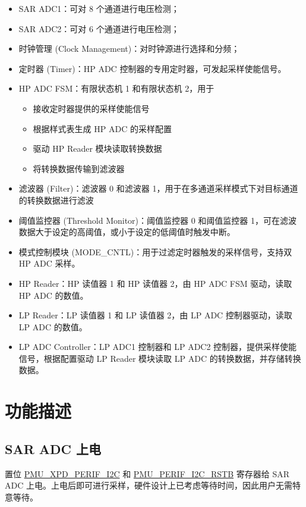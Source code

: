 \documentclass[main\_\_CN.tex]{subfiles}
\begin{document}
\begin{itemize}
    \item SAR ADC1：可对 8 个通道进行电压检测；
    \item SAR ADC2：可对 6 个通道进行电压检测；
    \item 时钟管理 (Clock Management)：对时钟源进行选择和分频；
    \item 定时器 (Timer)：HP ADC 控制器的专用定时器，可发起采样使能信号。
    \item HP ADC FSM：有限状态机 1 和有限状态机 2，用于
    \begin{itemize}
        \item 接收定时器提供的采样使能信号
        \item 根据样式表生成 HP ADC 的采样配置
        \item 驱动 HP Reader 模块读取转换数据
        \item 将转换数据传输到滤波器
    \end{itemize}
    \item 滤波器 (Filter)：滤波器 0 和滤波器 1，用于在多通道采样模式下对目标通道的转换数据进行滤波
    \item 阈值监控器 (Threshold Monitor)：阈值监控器 0 和阈值监控器 1，可在滤波数据大于设定的高阈值，或小于设定的低阈值时触发中断。
    \item 模式控制模块 (MODE\_CNTL)：用于过滤定时器触发的采样信号，支持双 HP ADC 采样。
    \item HP Reader：HP 读值器 1 和 HP 读值器 2，由 HP ADC FSM 驱动，读取 HP ADC 的数值。
    \item LP Reader：LP 读值器 1 和 LP 读值器 2，由 LP ADC 控制器驱动，读取 LP ADC  的数值。
    \item LP ADC Controller：LP ADC1 控制器和 LP ADC2 控制器，提供采样使能信号，根据配置驱动 LP Reader 模块读取 LP ADC 的转换数据，并存储转换数据。
\end{itemize}

\section{功能描述}
\subsection{SAR ADC 上电}
置位 \hyperref[fielddesc:PMUXPDPERIFI2C]{PMU\_XPD\_PERIF\_I2C} 和 \hyperref[fielddesc:PMUPERIFI2CRSTB]{PMU\_PERIF\_I2C\_RSTB} 寄存器给 SAR ADC 上电。上电后即可进行采样，硬件设计上已考虑等待时间，因此用户无需特意等待。
\end{document}
